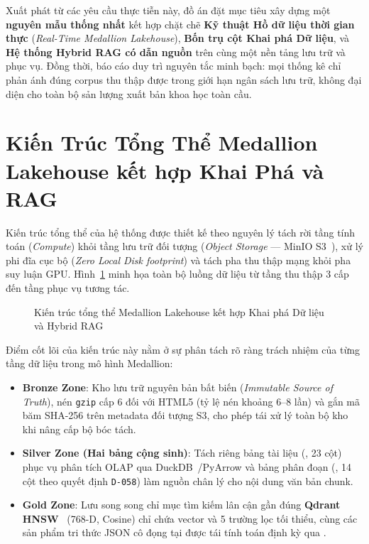 Xuất phát từ các yêu cầu thực tiễn này, đồ án đặt mục tiêu xây dựng một \textbf{nguyên mẫu thống nhất} kết hợp chặt chẽ \textbf{Kỹ thuật Hồ dữ liệu thời gian thực} (\textit{Real-Time Medallion Lakehouse}), \textbf{Bốn trụ cột Khai phá Dữ liệu}, và \textbf{Hệ thống Hybrid RAG có dẫn nguồn} trên cùng một nền tảng lưu trữ và phục vụ. Đồng thời, báo cáo duy trì nguyên tắc minh bạch: mọi thống kê chỉ phản ánh đúng corpus thu thập được trong giới hạn ngân sách lưu trữ, không đại diện cho toàn bộ sản lượng xuất bản khoa học toàn cầu.

\section{Kiến Trúc Tổng Thể Medallion Lakehouse kết hợp Khai Phá và RAG}
\label{sec:ch1_architecture}

Kiến trúc tổng thể của hệ thống được thiết kế theo nguyên lý tách rời tầng tính toán (\textit{Compute}) khỏi tầng lưu trữ đối tượng (\textit{Object Storage} --- MinIO S3~\cite{minio2023storage}), xử lý phi đĩa cục bộ (\textit{Zero Local Disk footprint}) và tách pha thu thập mạng khỏi pha suy luận GPU. Hình~\ref{fig:system_architecture} minh họa toàn bộ luồng dữ liệu từ tầng thu thập 3 cấp đến tầng phục vụ tương tác.

\begin{figure}[htbp]
  \centering
  \DrawSystemArchitecture
  \caption[Kiến trúc tổng thể Medallion Lakehouse kết hợp Khai phá và Hybrid RAG]{Kiến trúc tổng thể Medallion Lakehouse kết hợp Khai phá Dữ liệu và Hybrid RAG}
  \label{fig:system_architecture}
\end{figure}

Điểm cốt lõi của kiến trúc này nằm ở sự phân tách rõ ràng trách nhiệm của từng tầng dữ liệu trong mô hình Medallion:
\begin{itemize}
  \item \textbf{Bronze Zone}: Kho lưu trữ nguyên bản bất biến (\textit{Immutable Source of Truth}), nén \texttt{gzip} cấp 6 đối với HTML5 (tỷ lệ nén khoảng 6--8 lần) và gắn mã băm SHA-256 trên metadata đối tượng S3, cho phép tái xử lý toàn bộ kho khi nâng cấp bộ bóc tách.
  \item \textbf{Silver Zone (Hai bảng cộng sinh)}: Tách riêng bảng tài liệu (, 23 cột) phục vụ phân tích OLAP qua DuckDB~\cite{raasveldt2019duckdb}/PyArrow và bảng phân đoạn (, 14 cột theo quyết định \texttt{D-058}) làm nguồn chân lý cho nội dung văn bản chunk.
  \item \textbf{Gold Zone}: Lưu song song chỉ mục tìm kiếm lân cận gần đúng \textbf{Qdrant HNSW}~\cite{qdrant2023vector,malkov2018efficient} (768-D, Cosine) chỉ chứa vector và 5 trường lọc tối thiểu, cùng các sản phẩm tri thức JSON cô đọng tại  được tái tính toán định kỳ qua .
\end{itemize}

